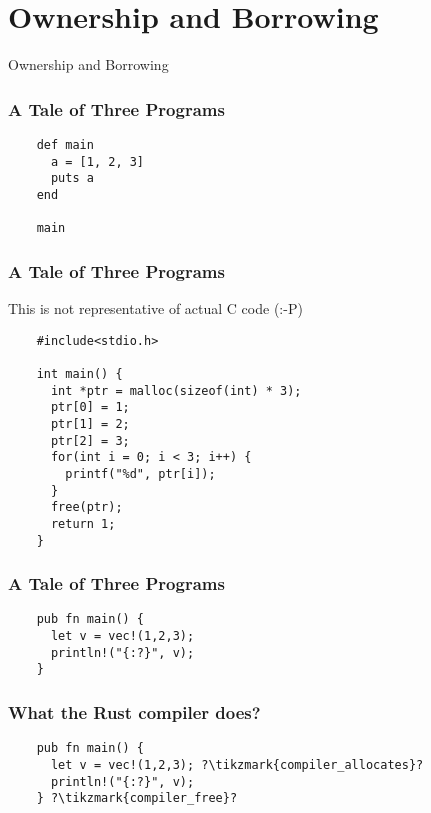 \section{Ownership and Borrowing}
\label{sec:ownership-borrowing}

\begin{frame}
  \centerline{
    \huge{Ownership and Borrowing}
  }
\end{frame}

\begin{frame}[fragile]
  \frametitle{A Tale of Three Programs}
  \begin{verbatim}
    def main
      a = [1, 2, 3]
      puts a
    end

    main
  \end{verbatim}
\end{frame}

\begin{frame}[fragile]
  \frametitle{A Tale of Three Programs}
  This is not representative of actual C code (:-P) \break{}
  \begin{verbatim}
    #include<stdio.h>

    int main() {
      int *ptr = malloc(sizeof(int) * 3);
      ptr[0] = 1;
      ptr[1] = 2;
      ptr[2] = 3;
      for(int i = 0; i < 3; i++) {
        printf("%d", ptr[i]);
      }
      free(ptr);
      return 1;
    }
  \end{verbatim}
\end{frame}

\begin{frame}[fragile]
  \frametitle{A Tale of Three Programs}
  \begin{verbatim}
    pub fn main() {
      let v = vec!(1,2,3);
      println!("{:?}", v);
    }
  \end{verbatim}
\end{frame}

\begin{frame}[fragile]
  \frametitle{What the Rust compiler does?}
  \begin{verbatim}
    pub fn main() {
      let v = vec!(1,2,3); ?\tikzmark{compiler_allocates}?
      println!("{:?}", v);
    } ?\tikzmark{compiler_free}?
  \end{verbatim}
\end{frame}

